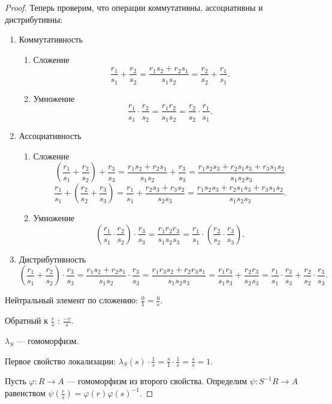 \documentclass[11pt]{book}
\theoremstyle{definition}
\theoremstyle{plain}
\theoremstyle{plain}
\theoremstyle{definition}
\theoremstyle{remark}
\begin{document}
\begin{proof}
    Теперь проверим, что операции коммутативны, ассоциативны и дистрибутивны:
    \begin{enumerate}
	\item  Коммутативность
	    \begin{enumerate}
		\item Сложение
		    \[
			\frac{r_1}{s_1} + \frac{r_2}{s_2} = \frac{r_1s_2+r_2s_1}{s_1s_2} = \frac{r_2}{s_2} + \frac{r_1}{s_1}
		    .\]
		\item Умножение
		    \[
			\frac{r_1}{s_1} \cdot \frac{r_2}{s_2} = \frac{r_1r_2}{s_1s_2} = \frac{r_2}{s_2} \cdot \frac{r_1}{s_1}
		    .\]
	    \end{enumerate}
	\item Ассоциативность
	    \begin{enumerate}
		\item Сложение
		    \[
			\left( \frac{r_1}{s_1} + \frac{r_2}{s_2} \right) + \frac{r_3}{s_3} = \frac{r_1s_2 + r_2 s_1}{s_1s_2} + \frac{r_3}{s_3} = \frac{r_1s_2s_3 + r_2s_1s_3 + r_3s_1s_2}{s_1s_2s_3}
		    \]
		    \[
			\frac{r_1}{s_1} + \left( \frac{r_2}{s_2}  + \frac{r_3}{s_3}\right) = \frac{r_1}{s_1} + \frac{r_2s_3 + r_3 s_2}{s_2s_3}= \frac{r_1s_2s_3 + r_2s_1s_3 + r_3s_1s_2}{s_1s_2s_3}
		    .\]
		\item Умножение
		    \[
			\left( \frac{r_1}{s_1} \cdot \frac{r_2}{s_2} \right)  \cdot \frac{r_3}{s_3} = \frac{r_1r_2r_3}{s_1s_2s_3} = \frac{r_1}{s_1} \cdot \left( \frac{r_2}{s_2} \cdot \frac{r_3}{s_3} \right)
		    .\]
	    \end{enumerate}
	\item Дистрибутивность
	    \[
		\left( \frac{r_1}{s_1} + \frac{r_2}{s_2} \right) \cdot \frac{r_3}{s_3} =  \frac{r_1s_2 + r_2s_1}{s_1s_2} \cdot \frac{r_3}{s_3} = \frac{r_1r_3s_2+r_2r_3s_1}{s_1s_2s_3} = \frac{r_1r_3}{s_1s_3} + \frac{r_2r_3}{s_2s_3} = \frac{r_1}{s_1}\cdot \frac{r_3}{s_3} + \frac{r_2}{s_2} \cdot \frac{r_3}{s_3}
	    .\]
    \end{enumerate}

    Нейтральный элемент по сложению: $ \frac{0}{1} = \frac{0}{s}$.

    Обратный к $ \frac{r}{s}$ : $ \frac{-r}{s}$.

    $ \lambda_S$ --- гомоморфизм.

    Первое свойство локализации:
    $\lambda_S(s) \cdot \frac{1}{s } =  \frac{s}{1 }\cdot \frac{1}{s} = \frac{s}{s}=1$.

    Пусть $ \varphi : R \to  A$ --- гомоморфизм из второго свойства. Определим $ \psi: S^{-1}R \to  A$ равенством $ \psi( \frac{r}{s}) = \varphi (r) \varphi (s)^{-1}$.


\end{proof}
\end{document}
